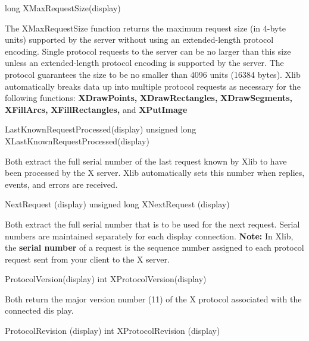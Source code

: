\documentclass{report}
\begin{document}
\begin{itemize}
            \bigbreak \noindent 
            \begin{cppcode}
            long XMaxRequestSize(display)
            \end{cppcode}
            \bigbreak \noindent 
            The XMaxRequestSize function returns the maximum request size (in 4-byte units) supported by the server without using an extended-length protocol encoding. Single protocol requests to the server can be no larger than this size unless an extended-length protocol encoding is supported by the server. The protocol guarantees the size to be no smaller than 4096 units (16384 bytes). Xlib automatically breaks data up into multiple protocol requests as necessary for the following functions: \textbf{XDrawPoints,} \textbf{XDrawRectangles,} \textbf{XDrawSegments,} \textbf{XFillArcs,} \textbf{XFillRectangles,} and \textbf{XPutImage}
            \bigbreak \noindent 
            \begin{cppcode}
            LastKnownRequestProcessed(display)
            unsigned long XLastKnownRequestProcessed(display)
            \end{cppcode}
            \bigbreak \noindent 
            Both extract the full serial number of the last request known by Xlib to have been processed by the X server. Xlib automatically sets this number when replies, events, and errors are received.
            \bigbreak \noindent 
            \begin{cppcode}
                NextRequest (display)
                unsigned long XNextRequest (display)
            \end{cppcode}
            \bigbreak \noindent 
            Both extract the full serial number that is to be used for the next request. Serial numbers are maintained separately for each display connection.
            \bigbreak \noindent 
            \textbf{Note:} In Xlib, the \textbf{serial number} of a request is the sequence number assigned to each protocol request sent from your client to the X server.
            \bigbreak \noindent 
            \begin{cppcode}
            ProtocolVersion(display)
            int XProtocolVersion(display)
            \end{cppcode}
            \bigbreak \noindent 
            Both return the major version number (11) of the X protocol associated with the connected dis play.
            \bigbreak \noindent 
            \begin{cppcode}
                ProtocolRevision (display)
                int XProtocolRevision (display)

\end{cppcode}
\end{itemize}
\end{document}

